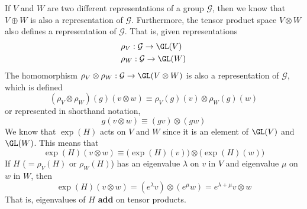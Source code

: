     \begin{definition}
      \label{def:tensor-product-of-representations}
      If $V$ and $W$ are two different representations of a group $\mathcal{G}$, then we know that $V \oplus W$ is also a representation of $\mathcal{G}$. Furthermore, the tensor product space $V \otimes W$ also defines a representation of $\mathcal{G}$. That is, given representations
      \begin{align*}
        & \rho_V: \mathcal{G} \rightarrow \GL(V) \\
        & \rho_W: \mathcal{G} \rightarrow \GL(W)
      \end{align*}
      The homomorphism $\rho_V \otimes \rho_W: \mathcal{G} \rightarrow \GL(V \otimes W)$ is also a representation of $\mathcal{G}$, which is defined
      \begin{equation}
        (\rho_V \otimes \rho_W)(g) (v \otimes w) \equiv \rho_V (g) (v) \otimes \rho_W (g) (w)
      \end{equation}
      or represented in shorthand notation, 
      \begin{equation}
        g(v \otimes w) \equiv (g v) \otimes (g w)
      \end{equation}
      We know that $\exp(H)$ acts on $V$ and $W$ since it is an element of $\GL(V)$ and $\GL(W)$. This means that
      \begin{equation}
        \exp(H)(v \otimes w) \equiv \big( \exp(H)(v)\big) \otimes \big( \exp(H)(w)\big)
      \end{equation}
      If $H$ ($= \rho_V (H)$ or $\rho_W(H)$) has an eigenvalue $\lambda$ on $v$ in $V$ and eigenvalue $\mu$ on $w$ in $W$, then 
      \begin{equation}
        \exp(H) (v \otimes w) = (e^\lambda v) \otimes (e^\mu w) = e^{\lambda + \mu} v \otimes w
      \end{equation}
      That is, eigenvalues of $H$ \textbf{add} on tensor products. 
    \end{definition}

